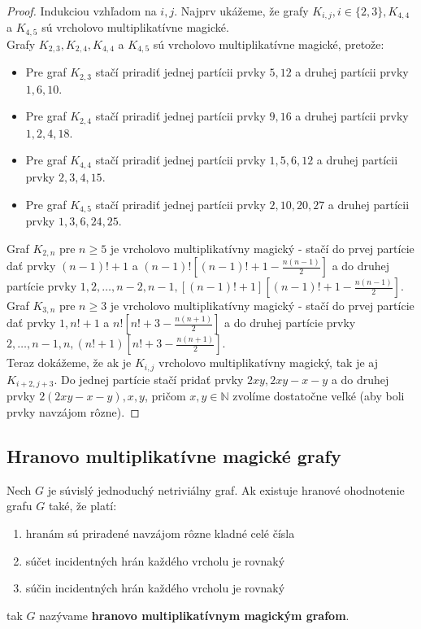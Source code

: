 \begin{proof} Indukciou vzhľadom na $i,j$. Najprv ukážeme, že grafy $K_{i,j}, i \in \{2,3\}, K_{4,4}$ a $K_{4,5}$ sú vrcholovo multiplikatívne magické. \\

Grafy $K_{2,3}, K_{2,4}, K_{4,4}$ a $K_{4,5}$ sú vrcholovo multiplikatívne magické, pretože:
\begin{itemize}
\item Pre graf $K_{2,3}$ stačí priradiť jednej partícii prvky $5, 12$ a druhej partícii prvky $1, 6, 10$.
\item Pre graf $K_{2,4}$ stačí priradiť jednej partícii prvky $9, 16$ a druhej partícii prvky $1, 2, 4, 18$.
\item Pre graf $K_{4,4}$ stačí priradiť jednej partícii prvky $1, 5, 6, 12$ a druhej partícii prvky $2, 3, 4, 15$.
\item Pre graf $K_{4,5}$ stačí priradiť jednej partícii prvky $2, 10, 20, 27$ a druhej partícii prvky $1, 3, 6, 24, 25$.
\end{itemize}

Graf $K_{2,n}$ pre $n \geq 5$ je vrcholovo multiplikatívny magický - stačí do prvej partície dať prvky $(n-1)! + 1$ a $(n-1)! [(n-1)! + 1 - \frac{n(n-1)}{2}]$ a do druhej partície prvky $1, 2, \dots , n-2, n-1, [(n-1)! + 1] [(n-1)! + 1 - \frac{n(n-1)}{2}]$. \\

Graf $K_{3,n}$ pre $n \geq 3$ je vrcholovo multiplikatívny magický - stačí do prvej partície dať prvky $1, n! + 1$ a $n! [n! + 3 - \frac{n(n+1)}{2}]$ a do druhej partície prvky $2, \dots , n-1, n, (n! + 1) [n! + 3 - \frac{n(n+1)}{2}]$. \\

Teraz dokážeme, že ak je $K_{i,j}$ vrcholovo multiplikatívny magický, tak je aj $K_{i+2,j+3}$. Do jednej partície stačí pridať prvky $2xy, 2xy - x - y$ a do druhej prvky $2(2xy - x - y), x, y$, pričom $x,y \in \mathbb{N}$ zvolíme dostatočne veľké (aby boli prvky navzájom rôzne).
\end{proof}



\subsection{Hranovo multiplikatívne magické grafy}

\begin{definition} Nech $G$ je súvislý jednoduchý netriviálny graf. Ak existuje hranové ohodnotenie grafu $G$ také, že platí:

\begin{enumerate}
\item hranám sú priradené navzájom rôzne kladné celé čísla
\item súčet incidentných hrán každého vrcholu je rovnaký
\item súčin incidentných hrán každého vrcholu je rovnaký
\end{enumerate}

tak $G$ nazývame \textbf{hranovo multiplikatívnym magickým grafom}.
\end{definition} 

